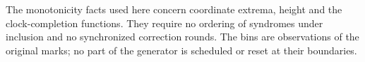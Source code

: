 The monotonicity facts used here concern coordinate extrema, height
and the clock-completion functions. They require no ordering of
syndromes under inclusion and no synchronized correction rounds.
The bins are observations of the original marks; no part of the
generator is scheduled or reset at their boundaries.
